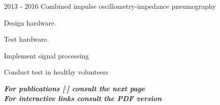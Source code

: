 \documentclass[letterpaper]{twentysecondcv} %
\begin{document}
\begin{RigthPage1}
\begin{twenty}
  
  \twentyitemlist
    	{2013 - 2016}
        {Combined impulse oscillometry-impedance pneumography~\cite{iosj,multi}}
        {}
        {
        \item Design hardware. 
        \item Test hardware. 
        \item Implement signal processing
        \item Conduct test in healthy volunteers
        }       
\end{twenty} 
\begin{flushright}
\textbf{\textit{For publications [$\cdot$] consult the next page}}
\\
\textbf{\textit{For interactive links consult the PDF version}}
\end{flushright}
\end{RigthPage1}


\newpage
\end{document}
